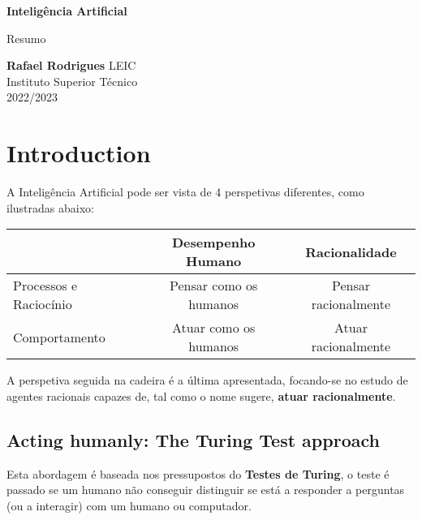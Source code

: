 \documentclass[11pt]{article}
\begin{document}
\begin{titlepage}
    \begin{center}
        \vspace*{1cm}

        \textbf{\LARGE Inteligência Artificial}
        \vspace{0.5cm}

        \Large Resumo
        \vspace{1.5cm}

        \textbf{Rafael Rodrigues}
        \vfill
        LEIC \\
        Instituto Superior Técnico \\
        2022/2023
    \end{center}
\end{titlepage}

\tableofcontents

\newpage
\section{Introduction}

A Inteligência Artificial pode ser vista de 4 perspetivas diferentes, como ilustradas abaixo:

\begin{tabular}[t]{ | l | c | c | }
    \hline
        & Desempenho Humano & Racionalidade \\\hline
    Processos e Raciocínio & Pensar como os humanos & Pensar racionalmente \\\hline
    Comportamento & Atuar como os humanos & Atuar racionalmente \\\hline
\end{tabular}
\vspace{10pt}

A perspetiva seguida na cadeira é a última apresentada, focando-se no estudo de agentes racionais capazes de, tal como o nome sugere, \textbf{atuar racionalmente}.

\subsection{Acting humanly: The Turing Test approach}

Esta abordagem é baseada nos pressupostos do \textbf{Testes de Turing}, o teste é passado se um humano não conseguir distinguir se está a responder a perguntas (ou a interagir) com um humano ou computador.\vspace{10pt}
\end{document}
